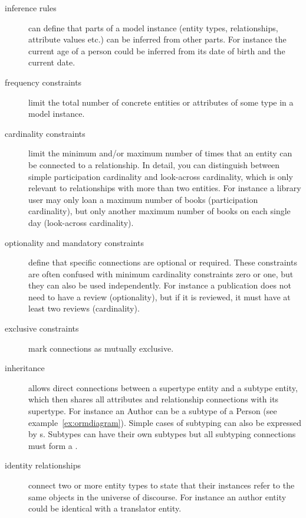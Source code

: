 \begin{description}
\item[inference rules] can define that parts of a model instance
  (entity types, relationships, attribute values etc.) can be inferred from 
  other parts. For instance the current age of a person could be inferred
  from its date of birth and the current date.

\item[frequency constraints] limit the total number of concrete entities or
  attributes of some type in a model instance.

\item[cardinality constraints] limit the minimum and/or maximum
  number of times that an entity can be connected to a relationship. In detail, 
  you can distinguish between simple participation cardinality and look-across 
  cardinality, which is only relevant to relationships with more than two entities.
  For instance a library user may only loan a maximum number of books (participation
  cardinality), but only another maximum number of books on each single day
  (look-across cardinality).

\item[optionality and mandatory constraints] define that specific
  connections are optional or required. These constraints are often confused
  with minimum cardinality constraints zero or one, but they can also be used
  independently. For instance a publication does not need to have a review
  (optionality),  but if it is reviewed, it must have at least two reviews
  (cardinality).

\item[exclusive constraints] mark connections as mutually exclusive.

\item[inheritance] allows direct connections between a supertype 
  entity and a subtype entity, which then shares all attributes and relationship 
  connections with its supertype. For instance an {\ormtext Author} can be
  a subtype of a {\ormtext Person} (see example~\ref{ex:ormdiagram}). Simple 
  cases of subtyping can also be
  expressed by s. Subtypes can have their own subtypes
  but all subtyping connections must form a .

\item[identity relationships] connect two or more entity types
  to state that their instances refer to the same objects in the 
  universe of discourse. For instance an author entity could be 
  identical with a translator entity.


\end{description}
